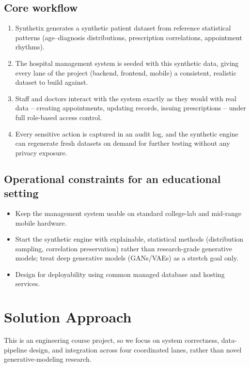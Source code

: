 \documentclass[11pt]{article}
\begin{document}
\subsection{Core workflow}
\begin{enumerate}
    \item Synthetix generates a synthetic patient dataset from reference statistical patterns (age--diagnosis distributions, prescription correlations, appointment rhythms).
    \item The hospital management system is seeded with this synthetic data, giving every lane of the project (backend, frontend, mobile) a consistent, realistic dataset to build against.
    \item Staff and doctors interact with the system exactly as they would with real data -- creating appointments, updating records, issuing prescriptions -- under full role-based access control.
    \item Every sensitive action is captured in an audit log, and the synthetic engine can regenerate fresh datasets on demand for further testing without any privacy exposure.
\end{enumerate}

\subsection{Operational constraints for an educational setting}
\begin{itemize}
    \item Keep the management system usable on standard college-lab and mid-range mobile hardware.
    \item Start the synthetic engine with explainable, statistical methods (distribution sampling, correlation preservation) rather than research-grade generative models; treat deep generative models (GANs/VAEs) as a stretch goal only.
    \item Design for deployability using common managed database and hosting services.
\end{itemize}

\section{Solution Approach}
This is an engineering course project, so we focus on system correctness, data-pipeline design, and integration across four coordinated lanes, rather than novel generative-modeling research.
\end{document}
